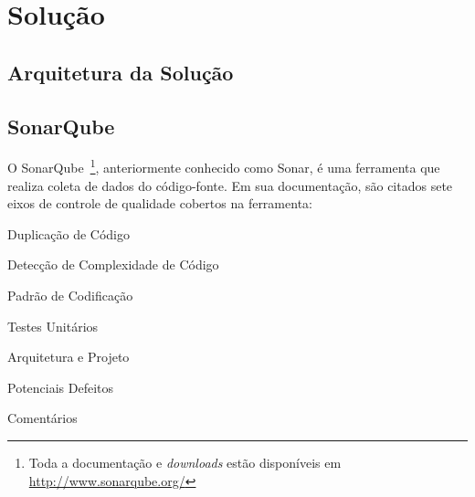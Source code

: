 \chapter{Solução}
\section{Arquitetura da Solução}
\section{SonarQube}
O SonarQube~\footnote{Toda a documentação e \textit{downloads} estão disponíveis
em \url{http://www.sonarqube.org/}}, anteriormente conhecido como Sonar, é uma 
ferramenta que realiza coleta de dados do código-fonte. Em sua documentação, 
são citados sete eixos de controle de qualidade cobertos na ferramenta: 


\begin{qualityindex}
\item Duplicação de Código
\item Detecção de Complexidade de Código
\item Padrão de Codificação
\item Testes Unitários
\item Arquitetura e Projeto
\item Potenciais Defeitos
\item Comentários
\end{qualityindex}

